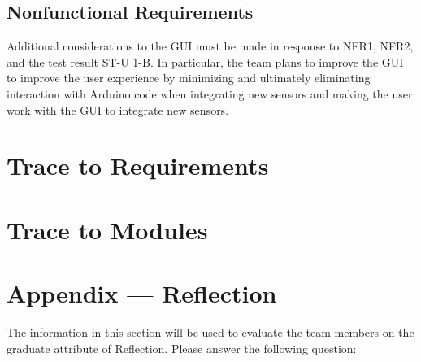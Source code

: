 \documentclass[12pt, titlepage]{article}
\begin{document}
\subsection{Nonfunctional Requirements}


Additional considerations to the GUI must be made in response to NFR1,  NFR2, and the test result ST-U 1-B. In particular, the team plans to improve the GUI to improve the user experience by minimizing and ultimately eliminating interaction with Arduino code when integrating new sensors and making the user work with the GUI to integrate new sensors. \\
		
\section{Trace to Requirements}
		
\section{Trace to Modules}		




\newpage{}
\section*{Appendix --- Reflection}

The information in this section will be used to evaluate the team members on the
graduate attribute of Reflection.  Please answer the following question:
\end{document}
